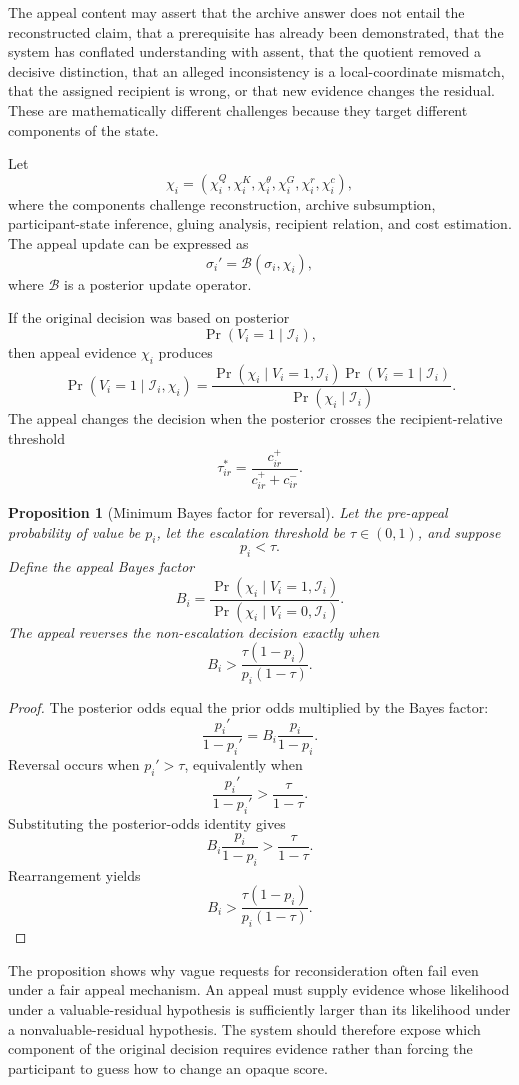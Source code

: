 \documentclass[11pt]{article}
\newtheorem{proposition}[definition]{Proposition}
\theoremstyle{definition}
\DeclareMathOperator{\Prob}{Pr}
\begin{document}
The appeal content may assert that the archive answer does not entail the reconstructed claim, that a prerequisite has already been demonstrated, that the system has conflated understanding with assent, that the quotient removed a decisive distinction, that an alleged inconsistency is a local-coordinate mismatch, that the assigned recipient is wrong, or that new evidence changes the residual. These are mathematically different challenges because they target different components of the state.

Let
\[
\chi_i
=
\left(
\chi_i^{Q},
\chi_i^{K},
\chi_i^{\theta},
\chi_i^{G},
\chi_i^{r},
\chi_i^{c}
\right),
\]
where the components challenge reconstruction, archive subsumption, participant-state inference, gluing analysis, recipient relation, and cost estimation. The appeal update can be expressed as
\[
\sigma_i'
=
\mathcal{B}\!\left(
\sigma_i,
\chi_i
\right),
\]
where \(\mathcal{B}\) is a posterior update operator.

If the original decision was based on posterior
\[
\Prob(V_i=1\mid\mathscr{I}_i),
\]
then appeal evidence \(\chi_i\) produces
\[
\Prob(V_i=1\mid\mathscr{I}_i,\chi_i)
=
\frac{
\Prob(\chi_i\mid V_i=1,\mathscr{I}_i)
\Prob(V_i=1\mid\mathscr{I}_i)
}{
\Prob(\chi_i\mid\mathscr{I}_i)
}.
\]
The appeal changes the decision when the posterior crosses the recipient-relative threshold
\[
\tau_{ir}^{*}
=
\frac{c_{ir}^{+}}{c_{ir}^{+}+c_{ir}^{-}}.
\]

\begin{proposition}[Minimum Bayes factor for reversal]
Let the pre-appeal probability of value be \(p_i\), let the escalation threshold be \(\tau\in(0,1)\), and suppose
\[
p_i<\tau.
\]
Define the appeal Bayes factor
\[
B_i
=
\frac{
\Prob(\chi_i\mid V_i=1,\mathscr{I}_i)
}{
\Prob(\chi_i\mid V_i=0,\mathscr{I}_i)
}.
\]
The appeal reverses the non-escalation decision exactly when
\[
B_i
>
\frac{\tau(1-p_i)}{p_i(1-\tau)}.
\]
\end{proposition}

\begin{proof}
The posterior odds equal the prior odds multiplied by the Bayes factor:
\[
\frac{p_i'}{1-p_i'}
=
B_i\frac{p_i}{1-p_i}.
\]
Reversal occurs when \(p_i'>\tau\), equivalently when
\[
\frac{p_i'}{1-p_i'}
>
\frac{\tau}{1-\tau}.
\]
Substituting the posterior-odds identity gives
\[
B_i\frac{p_i}{1-p_i}
>
\frac{\tau}{1-\tau}.
\]
Rearrangement yields
\[
B_i
>
\frac{\tau(1-p_i)}{p_i(1-\tau)}.
\]
\end{proof}

The proposition shows why vague requests for reconsideration often fail even under a fair appeal mechanism. An appeal must supply evidence whose likelihood under a valuable-residual hypothesis is sufficiently larger than its likelihood under a nonvaluable-residual hypothesis. The system should therefore expose which component of the original decision requires evidence rather than forcing the participant to guess how to change an opaque score.
\end{document}
